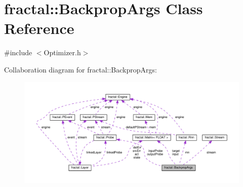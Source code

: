 \hypertarget{classfractal_1_1BackpropArgs}{\section{fractal\+:\+:Backprop\+Args Class Reference}
\label{classfractal_1_1BackpropArgs}
}


{\ttfamily \#include $<$Optimizer.\+h$>$}



Collaboration diagram for fractal\+:\+:Backprop\+Args\+:\nopagebreak
\begin{figure}[H]
\begin{center}
\leavevmode
\includegraphics[width=350pt]{db/d39/classfractal_1_1BackpropArgs__coll__graph}
\end{center}
\end{figure}
